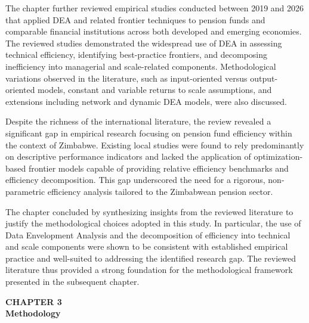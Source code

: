 \documentclass[12pt,a4paper]{article}
\begin{document}
The chapter further reviewed empirical studies conducted between 2019 and 2026 that applied DEA and related frontier techniques to pension funds and comparable financial institutions across both developed and emerging economies. The reviewed studies demonstrated the widespread use of DEA in assessing technical efficiency, identifying best-practice frontiers, and decomposing inefficiency into managerial and scale-related components. Methodological variations observed in the literature, such as input-oriented versus output-oriented models, constant and variable returns to scale assumptions, and extensions including network and dynamic DEA models, were also discussed.

Despite the richness of the international literature, the review revealed a significant gap in empirical research focusing on pension fund efficiency within the context of Zimbabwe. Existing local studies were found to rely predominantly on descriptive performance indicators and lacked the application of optimization-based frontier models capable of providing relative efficiency benchmarks and efficiency decomposition. This gap underscored the need for a rigorous, non-parametric efficiency analysis tailored to the Zimbabwean pension sector.

The chapter concluded by synthesizing insights from the reviewed literature to justify the methodological choices adopted in this study. In particular, the use of Data Envelopment Analysis and the decomposition of efficiency into technical and scale components were shown to be consistent with established empirical practice and well-suited to addressing the identified research gap. The reviewed literature thus provided a strong foundation for the methodological framework presented in the subsequent chapter.

\newpage

\begin{center}
    {\LARGE\bfseries CHAPTER 3}\\[0.5cm]
    {\Large\bfseries Methodology}
\end{center}
\setcounter{section}{0}
\renewcommand{\thesection}{3.\arabic{section}}
{}

\vspace{1cm}

\end{document}
